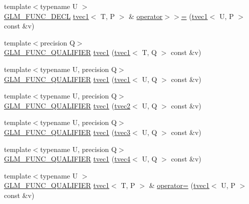 \begin{DoxyCompactItemize}
\item 
{\footnotesize template$<$typename U $>$ }\\\hyperlink{setup_8hpp_ab2d052de21a70539923e9bcbf6e83a51}{G\+L\+M\+\_\+\+F\+U\+N\+C\+\_\+\+D\+E\+CL} \hyperlink{structglm_1_1detail_1_1tvec1}{tvec1}$<$ T, P $>$ \& \hyperlink{structglm_1_1detail_1_1tvec1_a9cbcbbf300a0197e674bc97e277f9683}{operator$>$$>$=} (\hyperlink{structglm_1_1detail_1_1tvec1}{tvec1}$<$ U, P $>$ const \&v)
\item 
{\footnotesize template$<$precision Q$>$ }\\\hyperlink{setup_8hpp_a33fdea6f91c5f834105f7415e2a64407}{G\+L\+M\+\_\+\+F\+U\+N\+C\+\_\+\+Q\+U\+A\+L\+I\+F\+I\+ER} \hyperlink{structglm_1_1detail_1_1tvec1_a78ba11094b516ebbb487a9c37714d7c0}{tvec1} (\hyperlink{structglm_1_1detail_1_1tvec1}{tvec1}$<$ T, Q $>$ const \&v)
\item 
{\footnotesize template$<$typename U, precision Q$>$ }\\\hyperlink{setup_8hpp_a33fdea6f91c5f834105f7415e2a64407}{G\+L\+M\+\_\+\+F\+U\+N\+C\+\_\+\+Q\+U\+A\+L\+I\+F\+I\+ER} \hyperlink{structglm_1_1detail_1_1tvec1_a608940c30970eec33519348c3fedcb6f}{tvec1} (\hyperlink{structglm_1_1detail_1_1tvec1}{tvec1}$<$ U, Q $>$ const \&v)
\item 
{\footnotesize template$<$typename U, precision Q$>$ }\\\hyperlink{setup_8hpp_a33fdea6f91c5f834105f7415e2a64407}{G\+L\+M\+\_\+\+F\+U\+N\+C\+\_\+\+Q\+U\+A\+L\+I\+F\+I\+ER} \hyperlink{structglm_1_1detail_1_1tvec1_a83c61bae71b14ac2cba715eee715dea7}{tvec1} (\hyperlink{structglm_1_1detail_1_1tvec2}{tvec2}$<$ U, Q $>$ const \&v)
\item 
{\footnotesize template$<$typename U, precision Q$>$ }\\\hyperlink{setup_8hpp_a33fdea6f91c5f834105f7415e2a64407}{G\+L\+M\+\_\+\+F\+U\+N\+C\+\_\+\+Q\+U\+A\+L\+I\+F\+I\+ER} \hyperlink{structglm_1_1detail_1_1tvec1_a3c252050abfe0ec01b6ff89566883d8f}{tvec1} (\hyperlink{structglm_1_1detail_1_1tvec3}{tvec3}$<$ U, Q $>$ const \&v)
\item 
{\footnotesize template$<$typename U, precision Q$>$ }\\\hyperlink{setup_8hpp_a33fdea6f91c5f834105f7415e2a64407}{G\+L\+M\+\_\+\+F\+U\+N\+C\+\_\+\+Q\+U\+A\+L\+I\+F\+I\+ER} \hyperlink{structglm_1_1detail_1_1tvec1_afc81da6a984943c6e773834ab7fc75f0}{tvec1} (\hyperlink{structglm_1_1detail_1_1tvec4}{tvec4}$<$ U, Q $>$ const \&v)
\item 
{\footnotesize template$<$typename U $>$ }\\\hyperlink{setup_8hpp_a33fdea6f91c5f834105f7415e2a64407}{G\+L\+M\+\_\+\+F\+U\+N\+C\+\_\+\+Q\+U\+A\+L\+I\+F\+I\+ER} \hyperlink{structglm_1_1detail_1_1tvec1}{tvec1}$<$ T, P $>$ \& \hyperlink{structglm_1_1detail_1_1tvec1_afdd165d59a6a8369e37b85676929e05d}{operator=} (\hyperlink{structglm_1_1detail_1_1tvec1}{tvec1}$<$ U, P $>$ const \&v)

\end{DoxyCompactItemize}
